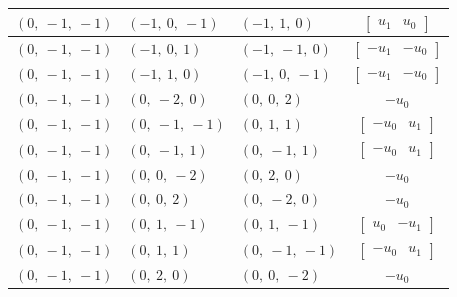 \documentclass[11pt]{article}
\theoremstyle{definition}
\begin{document}
\begin{longtable}{|l|l|l|c|}
    \hline
    $\left( 0, \  -1, \  -1\right)$ & $\left( -1, \  0, \  -1\right)$ & $\left( -1, \  1, \  0\right)$ & $\left[\begin{matrix}u_{1} & u_{0}\end{matrix}\right]$ \\
    \hline
    $\left( 0, \  -1, \  -1\right)$ & $\left( -1, \  0, \  1\right)$ & $\left( -1, \  -1, \  0\right)$ & $\left[\begin{matrix}- u_{1} & - u_{0}\end{matrix}\right]$ \\
    \hline
    $\left( 0, \  -1, \  -1\right)$ & $\left( -1, \  1, \  0\right)$ & $\left( -1, \  0, \  -1\right)$ & $\left[\begin{matrix}- u_{1} & - u_{0}\end{matrix}\right]$ \\
    \hline
    $\left( 0, \  -1, \  -1\right)$ & $\left( 0, \  -2, \  0\right)$ & $\left( 0, \  0, \  2\right)$ & $- u_{0}$ \\
    \hline
    $\left( 0, \  -1, \  -1\right)$ & $\left( 0, \  -1, \  -1\right)$ & $\left( 0, \  1, \  1\right)$ & $\left[\begin{matrix}- u_{0} & u_{1}\end{matrix}\right]$ \\
    \hline
    $\left( 0, \  -1, \  -1\right)$ & $\left( 0, \  -1, \  1\right)$ & $\left( 0, \  -1, \  1\right)$ & $\left[\begin{matrix}- u_{0} & u_{1}\end{matrix}\right]$ \\
    \hline
    $\left( 0, \  -1, \  -1\right)$ & $\left( 0, \  0, \  -2\right)$ & $\left( 0, \  2, \  0\right)$ & $- u_{0}$ \\
    \hline
    $\left( 0, \  -1, \  -1\right)$ & $\left( 0, \  0, \  2\right)$ & $\left( 0, \  -2, \  0\right)$ & $- u_{0}$ \\
    \hline
    $\left( 0, \  -1, \  -1\right)$ & $\left( 0, \  1, \  -1\right)$ & $\left( 0, \  1, \  -1\right)$ & $\left[\begin{matrix}u_{0} & - u_{1}\end{matrix}\right]$ \\
    \hline
    $\left( 0, \  -1, \  -1\right)$ & $\left( 0, \  1, \  1\right)$ & $\left( 0, \  -1, \  -1\right)$ & $\left[\begin{matrix}- u_{0} & u_{1}\end{matrix}\right]$ \\
    \hline
    $\left( 0, \  -1, \  -1\right)$ & $\left( 0, \  2, \  0\right)$ & $\left( 0, \  0, \  -2\right)$ & $- u_{0}$ \\

\end{longtable}
\end{document}

